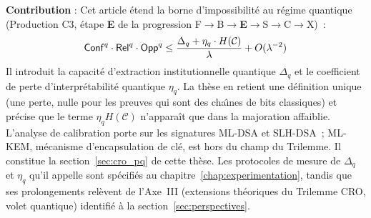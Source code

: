 \begin{sloppypar}
\noindent\textbf{Contribution} : Cet article \'etend la borne d'impossibilit\'e
au r\'egime quantique (Production C3, \'etape \textbf{E} de la progression
F$\to$B$\to$\textbf{E}$\to$S$\to$C$\to$X)~:
\begin{equation}
\mathsf{Conf}^q \cdot \mathsf{Rel}^q \cdot \mathsf{Opp}^q \leq \frac{\Delta_q + \eta_q \cdot H(\mathcal{C})}{\lambda}
  + O(\lambda^{-2})
\end{equation}
Il introduit la capacit\'e d'extraction institutionnelle quantique $\Delta_q$
et le coefficient de perte d'interpr\'etabilit\'e quantique $\eta_q$. La th\`ese
en retient une d\'efinition unique (une perte, nulle pour les preuves qui sont
des cha\^{\i}nes de bits classiques) et pr\'ecise que le terme $\eta_q H(\mathcal{C})$
n'appara\^it que dans la majoration affaiblie. L'analyse de calibration
porte sur les signatures ML-DSA et SLH-DSA~; ML-KEM, m\'ecanisme d'encapsulation
de cl\'e, est hors du champ du Trilemme.
Il constitue la section~\ref{sec:cro_pq} de cette th\`ese. Les protocoles de
mesure de $\Delta_q$ et $\eta_q$ qu'il appelle sont sp\'ecifi\'es au
chapitre~\ref{chap:experimentation}, tandis que ses prolongements rel\`event de l'Axe~III
(extensions th\'eoriques du Trilemme CRO, volet quantique) identifi\'e \`a la
section~\ref{sec:perspectives}.

\end{sloppypar}